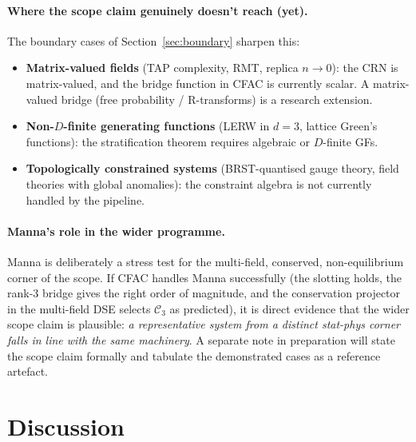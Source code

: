 \documentclass[10pt,a4paper,twocolumn]{article}
\theoremstyle{plain}
\theoremstyle{definition}
\newcommand{\Cstr}[1]{\mathcal{C}_{#1}}
\begin{document}
\paragraph{Where the scope claim genuinely doesn't reach (yet).}
The boundary cases of Section~\ref{sec:boundary} sharpen this:
\begin{itemize}[leftmargin=1.2em,itemsep=1pt]
  \item \textbf{Matrix-valued fields} (TAP complexity, RMT,
    replica $n\to 0$): the CRN is matrix-valued, and the bridge
    function in CFAC is currently scalar.  A matrix-valued bridge
    (free probability / R-transforms) is a research extension.
  \item \textbf{Non-$D$-finite generating functions} (LERW in
    $d=3$, lattice Green's functions): the stratification theorem
    requires algebraic or $D$-finite GFs.
  \item \textbf{Topologically constrained systems} (BRST-quantised
    gauge theory, field theories with global anomalies): the
    constraint algebra is not currently handled by the pipeline.
\end{itemize}

\paragraph{Manna's role in the wider programme.}
Manna is deliberately a stress test for the multi-field, conserved,
non-equilibrium corner of the scope.  If CFAC handles Manna
successfully (the slotting holds, the rank-3 bridge gives the right
order of magnitude, and the conservation projector in the multi-field
DSE selects $\Cstr{3}$ as predicted), it is direct evidence that
the wider scope claim is plausible: \emph{a representative system from a
distinct stat-phys corner falls in line with the same machinery}.
A separate note in preparation will state the scope claim formally
and tabulate the demonstrated cases as a reference artefact.

\section{Discussion}
\label{sec:discussion}
\end{document}

